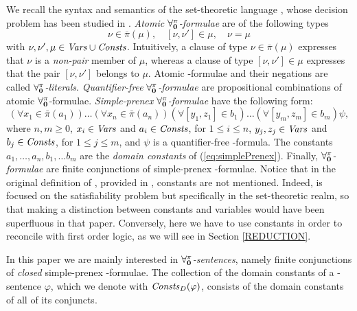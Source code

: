 \documentclass[a4paper]{llncs}
\newcommand{\pairin}[3]{\left[#1,#2\right] \in #3}
\newcommand{\nonpairin}[2]{#1 \in \bar{\pi}(#2)}
\newcommand{\seteq}[2]{#1=#2}
\newcommand{\DomConsts}{\Consts_D}
\begin{document}
We recall the syntax and semantics of the set-theoretic
language \Forallpizero, whose decision problem has been studied in 
\cite{CanLonNic2011}.
\emph{Atomic }$\mathbf{\forall_{0}^{\pi}}$\emph{-formulae} are of the following types
\begin{equation}\label{ATFORM}
    \nonpairin{\nu}{\mu}, \quad \pairin{\nu}{\nu'}{\mu}, \quad \seteq{\nu}{\mu}
\end{equation}
with $\nu, \nu', \mu \in \mathit{Vars} \cup \mathit{Consts}$. Intuitively,
a clause of type $\nonpairin{\nu}{\mu}$
expresses that $\nu$ is a \emph{non-pair} member of $\mu$,
whereas a clause of type $[\nu, \nu'] \in \mu$ expresses
that the pair $[\nu, \nu']$ belongs to $\mu$. Atomic
\Forallpizero-formulae and their negations are called
$\mathbf{\forall_{0}^{\pi}}$\emph{-literals}. \emph{Quantifier-free }
$\mathbf{\forall_{0}^{\pi}}$\emph{-formulae} are propositional combinations of atomic
$\mathbf{\forall_{0}^{\pi}}$-formulae. \emph{Simple-prenex }$\mathbf{\forall_{0}^{\pi}}$\emph{-formulae}
have the following form:
\begin{equation}\label{eq:simplePrenex}
  (\forall \nonpairin{x_1}{a_1})\ldots(\forall 
\nonpairin{x_n}{a_n})(\forall \pairin{y_1}{z_1}{b_1})\ldots(\forall 
\pairin{y_m}{z_m}{b_m})\psi,
\end{equation}
where $n, m \geq 0$, $x_i \in \mathit{Vars}$ and
$a_i \in \mathit{Consts}$, for $1 \leq i \leq n$,
$y_j, z_j \in \mathit{Vars}$ and $b_j \in \mathit{Consts}$, for
$1 \leq j \leq m$, and $\psi$ is a quantifier-free
\Forallpizero-formula. The constants $a_1, \ldots, a_n, b_1, \ldots b_m$
are the \emph{domain constants} of (\ref{eq:simplePrenex}).
Finally, $\mathbf{\forall_{0}^{\pi}}$\emph{-formulae} are finite
conjunctions of simple-prenex \Forallpizero-formulae.
Notice that in the original definition of
\Forallpizero,
provided in \cite{CanLonNic2011}, constants are not mentioned.
Indeed, \cite{CanLonNic2011} is focused on the satisfiability
problem but specifically in the set-theoretic realm, so that
making a distinction between constants and variables would have been 
superfluous in that paper.
Conversely, here we have to use constants in order to 
reconcile \Forallpizero with first order logic, as we will
see in Section \ref{REDUCTION}. 

In this paper we are mainly interested in 
$\mathbf{\forall_{0}^{\pi}}$\emph{-sentences}, namely finite conjunctions of 
\emph{closed} simple-prenex \Forallpizero-formulae.
The collection of the domain constants of a
\Forallpizero-sentence $\varphi$, which we denote with $\DomConsts(\varphi)$,
consists of the domain constants of all of its conjuncts.
\end{document}
